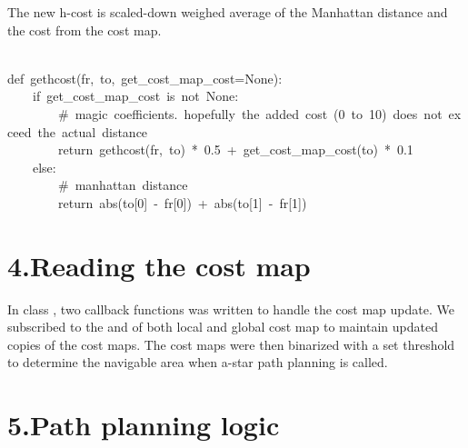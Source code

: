 \documentclass{article}
\begin{document}
\noindent{}The new h-cost is scaled-down weighed average of the Manhattan distance and the cost from the cost map.%
\begin{mdpre}%
\\
{def}~gethcost(fr,~to,~get\_cost\_map\_cost{=}{None}){:}\\
~~~~{if}~get\_cost\_map\_cost~{is}~{not}~{None}{:}\\
~~~~~~~~{\#~magic~coefficients.~hopefully~the~added~cost~(0~to~10)~does~not~exceed~the~actual~distance}\\
~~~~~~~~{return}~gethcost(fr,~to)~*~{0.5}~+~get\_cost\_map\_cost(to)~*~{0.1}\\
~~~~{else}{:}\\
~~~~~~~~{\#~manhattan~distance}\\
~~~~~~~~{return}~abs(to[{0}]~-~fr[{0}])~+~abs(to[{1}]~-~fr[{1}])%
\end{mdpre}
\section{4.\hspace*{0.5em}Reading the cost map}\label{sec-reading-the-cost-map}%

\noindent{}In class , two callback functions was written to handle the cost map update. We subscribed to the  and  of both local and global cost map to maintain updated copies of the cost maps. The cost maps were then binarized with a set threshold to determine the navigable area when a-star path planning is called.%

\section{5.\hspace*{0.5em}Path planning logic}\label{sec-path-planning-logic}%
\end{document}

